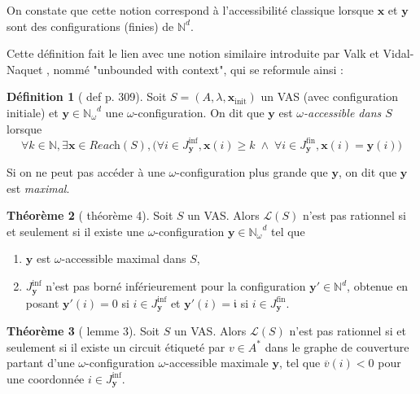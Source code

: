 \documentclass[a4paper,final]{article}
\theoremstyle{definition}
\newtheorem{Theorem}{Théorème}
\newtheorem{Definition}[Theorem]{Définition}
\let\geq\geqslant
\newcommand{\set}[2]{\left\{#1\mathrel{\left|\vphantom{#1}\vphantom{#2}\right.}#2\right\}}
\newcommand{\N}{\ensuremath{\mathbb{N}}}
\newcommand{\Nomega}{\ensuremath{\mathbb{N}_\omega}}
\newcommand{\lang}{\ensuremath{\mathcal{L}}}
\newcommand{\reach}{\ensuremath{\textit{Reach}}}
\newcommand{\vect}[1]{\ensuremath{\mathbf{#1}}}
\newcommand{\xinit}{\ensuremath{\vect{x}_\text{init}}}
\newcommand{\valeur}[1]{\ensuremath{\overline{#1}}}
\newcommand{\Jfin}[1]{J^\text{fin}_{#1}}
\newcommand{\Jinf}[1]{J^\text{inf}_{#1}}
\begin{document}
On constate que cette notion correspond à l'accessibilité classique lorsque $\vect{x}$ et $\vect{y}$ sont des configurations (finies) de $\N^d$.

Cette définition fait le lien avec une notion similaire introduite par Valk et Vidal-Naquet \cite{vavn81}, nommé "unbounded with context", qui se reformule ainsi :

\begin{Definition}[\cite{vavn81} def p. 309]
Soit $S = (A,\lambda,\xinit)$ un VAS (avec configuration initiale) et $\vect{y} \in \Nomega^d$ une $\omega$-configuration.
On dit que $\vect{y}$ est \emph{$\omega$-accessible dans $S$} lorsque
$$\forall k\in\N, \exists \vect{x}\in\reach(S), \big( \forall i\in \Jinf{\vect{y}}, \vect{x}(i) \geq k \;\land\; \forall i \in \Jfin{\vect{y}}, \vect{x}(i) = \vect{y}(i) \big)$$

Si on ne peut pas accéder à une $\omega$-configuration  plus grande que $\vect{y}$, on dit que $\vect{y}$ est \emph{maximal}.
\end{Definition}

\begin{Theorem}[\cite{vavn81} théorème 4]
Soit $S$ un VAS.
Alors $\lang(S)$ n'est pas rationnel si et seulement si
il existe une $\omega$-configuration $\vect{y} \in \Nomega^d$ tel que
\begin{enumerate}
    \item $\vect{y}$ est $\omega$-accessible maximal dans $S$,
    \item $\Jinf{\vect{y}}$ n'est pas borné inférieurement pour la configuration $\vect{y'}\in\N^d$, 
    obtenue en posant $\vect{y'}(i) = 0$ si $i\in \Jinf{\vect{y}}$ et $\vect{y'}(i) = \mathfrak{i}$ si $i\in \Jfin{\vect{y}}$.
\end{enumerate}
\end{Theorem}

\begin{Theorem}[\cite{vavn81} lemme 3]
Soit $S$ un VAS.
Alors $\lang(S)$ n'est pas rationnel si et seulement si
il existe un circuit étiqueté par $v\in A^*$ dans le graphe de couverture partant d'une $\omega$-configuration $\omega$-accessible maximale $\vect{y}$, 
tel que $\valeur{v}(i) < 0$ pour une coordonnée $i\in \Jinf{\vect{y}}$.
\end{Theorem}
\end{document}
